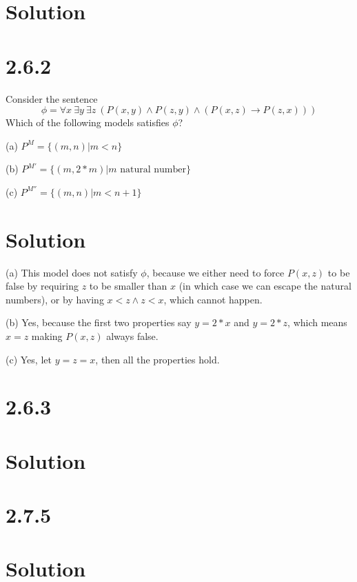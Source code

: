 \documentclass[10pt]{article}
\begin{document}
\section*{Solution}

\section*{2.6.2}
Consider the sentence
\[
\phi = \forall x\ \exists y\ \exists z\ (P(x,y)\land P(z,y) \land (P(x,z)\to P(z,x)))
\]
Which of the following models satisfies $\phi$?
\begin{description*}
\item[(a)] $P^M = \{ (m,n) | m < n \}$
\item[(b)] $P^{M'} = \{ (m,2*m) | m \text{ natural number} \}$ 
\item[(c)] $P^{M''} = \{ (m,n) | m < n + 1\}$
\end{description*}
\section*{Solution}
\begin{description*}
\item[(a)] This model does not satisfy $\phi$, because we either need to force $P(x,z)$ to be false by requiring $z$ to be smaller than $x$ (in which case we can escape the natural numbers), or by having $x<z \land z<x$, which cannot happen.
\item[(b)] Yes, because the first two properties say $y=2*x$ and $y=2*z$, which means $x=z$ making $P(x,z)$ always false.
\item[(c)] Yes, let $y=z=x$, then all the properties hold.
\end{description*}
\section*{2.6.3}

\section*{Solution}

\section*{2.7.5}

\section*{Solution}
\end{document}
